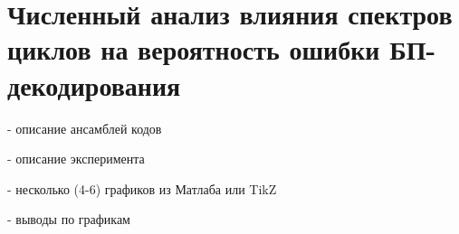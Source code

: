 \chapter{Численный анализ влияния спектров циклов на вероятность ошибки 
БП-декодирования} 

- описание ансамблей кодов

- описание эксперимента

- несколько (4-6) графиков из Матлаба или  TikZ

- выводы по графикам
